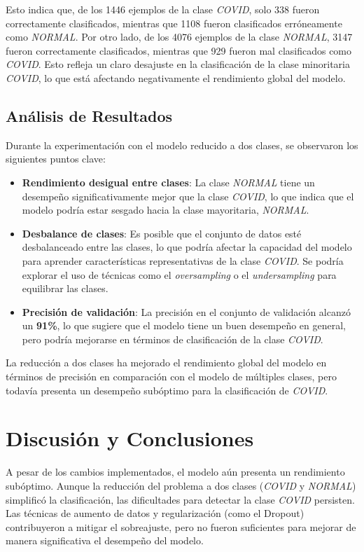 \documentclass{article}
\begin{document}
Esto indica que, de los 1446 ejemplos de la clase \textit{COVID}, solo 338 fueron correctamente clasificados, mientras que 1108 fueron clasificados erróneamente como \textit{NORMAL}. Por otro lado, de los 4076 ejemplos de la clase \textit{NORMAL}, 3147 fueron correctamente clasificados, mientras que 929 fueron mal clasificados como \textit{COVID}. Esto refleja un claro desajuste en la clasificación de la clase minoritaria \textit{COVID}, lo que está afectando negativamente el rendimiento global del modelo.


\newpage
	
\subsection{Análisis de Resultados}

Durante la experimentación con el modelo reducido a dos clases, se observaron los siguientes puntos clave:

\begin{itemize}
	\item \textbf{Rendimiento desigual entre clases}: La clase \textit{NORMAL} tiene un desempeño significativamente mejor que la clase \textit{COVID}, lo que indica que el modelo podría estar sesgado hacia la clase mayoritaria, \textit{NORMAL}.
	\item \textbf{Desbalance de clases}: Es posible que el conjunto de datos esté desbalanceado entre las clases, lo que podría afectar la capacidad del modelo para aprender características representativas de la clase \textit{COVID}. Se podría explorar el uso de técnicas como el \textit{oversampling} o el \textit{undersampling} para equilibrar las clases.
	\item \textbf{Precisión de validación}: La precisión en el conjunto de validación alcanzó un \textbf{91\%}, lo que sugiere que el modelo tiene un buen desempeño en general, pero podría mejorarse en términos de clasificación de la clase \textit{COVID}.
\end{itemize}

La reducción a dos clases ha mejorado el rendimiento global del modelo en términos de precisión en comparación con el modelo de múltiples clases, pero todavía presenta un desempeño subóptimo para la clasificación de \textit{COVID}.


	\section{Discusión y Conclusiones}
	A pesar de los cambios implementados, el modelo aún presenta un rendimiento subóptimo. Aunque la reducción del problema a dos clases (\textit{COVID} y \textit{NORMAL}) simplificó la clasificación, las dificultades para detectar la clase \textit{COVID} persisten. Las técnicas de aumento de datos y regularización (como el Dropout) contribuyeron a mitigar el sobreajuste, pero no fueron suficientes para mejorar de manera significativa el desempeño del modelo.
	\\
	
\end{document}
